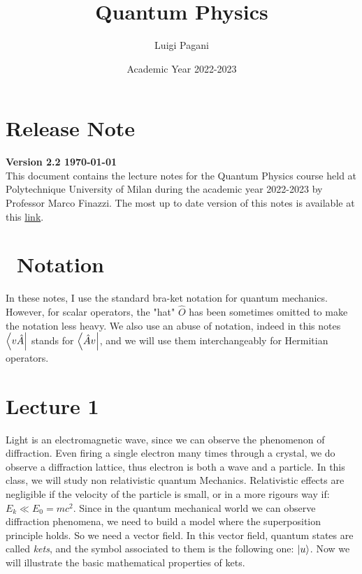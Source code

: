 \documentclass{article}
\title{Quantum Physics}
\author{Luigi Pagani}
\date{Academic Year 2022-2023}
\begin{document}
\maketitle
\noindent 

\section*{Release Note}
\textbf{Version 2.2 \today} \\
This document contains the lecture notes for the Quantum Physics course held at Polytechnique University of Milan during the academic year 2022-2023 by Professor Marco Finazzi. 
The most up to date version of this notes is available at this \href{https://it.overleaf.com/read/wtnwkpkkyzsq}{link}.

\section*{ \danger \  Notation}
In these notes, I use the standard bra-ket notation for quantum mechanics. However, for scalar operators, the "hat" $\hat{O}$ has been sometimes omitted to make the notation less heavy.
We also  use an abuse of notation, indeed in this notes  $\bra{v\hat{A}}$ stands for $\bra{\hat{A}v}$, and we will use them interchangeably for Hermitian operators. 

\newpage 
\tableofcontents 
\newpage
\section{Lecture 1}

Light is an electromagnetic wave, since we can observe the phenomenon of diffraction.
Even firing a single electron many times through a crystal, we do observe a diffraction lattice, thus electron is both a wave and a particle.
In this class, we will study non relativistic quantum Mechanics. Relativistic effects are negligible if the velocity of the particle is small, or in a more rigours way if: $E_k \ll E_0 = mc^2.$
Since in the quantum mechanical world we can observe diffraction phenomena, we need to build a model where the superposition principle holds. So we need a vector field. In this vector field, quantum states are called \emph{kets}, and the symbol associated to them is the following one: $ \ket{u}$.
Now we will illustrate the basic mathematical properties of kets.
\end{document}
